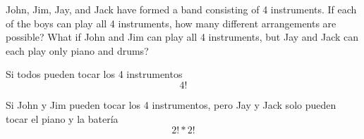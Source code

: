 \item  John, Jim, Jay, and Jack have formed a band consisting of 4 instruments. If each of the boys can play all 4 instruments, how many different arrangements are possible? What if John and Jim can play all 4 instruments, but Jay and Jack can each play only piano and drums?

Si todos pueden tocar los 4 instrumentos
\[ 4! \]

Si John y Jim pueden tocar los 4 instrumentos, pero Jay y Jack solo pueden tocar el piano y la batería
\[ 2! * 2! \]